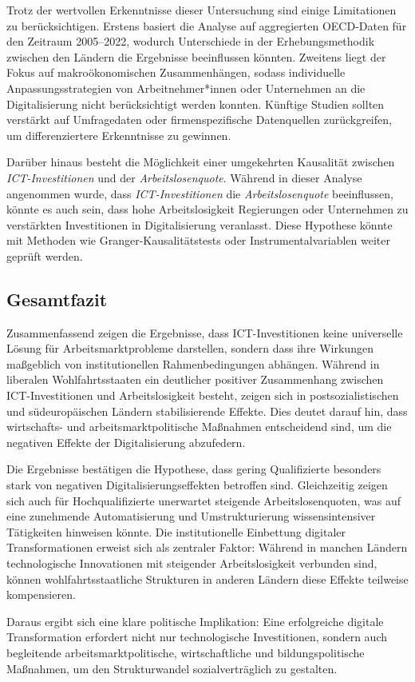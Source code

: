 Trotz der wertvollen Erkenntnisse dieser Untersuchung sind einige Limitationen zu 
berücksichtigen. Erstens basiert die Analyse auf aggregierten \ac{OECD}-Daten für den 
Zeitraum 2005–2022, wodurch Unterschiede in der Erhebungsmethodik zwischen den Ländern 
die Ergebnisse beeinflussen könnten. Zweitens liegt der Fokus auf makroökonomischen 
Zusammenhängen, sodass individuelle Anpassungsstrategien von Arbeitnehmer*innen oder 
Unternehmen an die Digitalisierung nicht berücksichtigt werden konnten. Künftige Studien 
sollten verstärkt auf Umfragedaten oder firmenspezifische Datenquellen zurückgreifen, um 
differenziertere Erkenntnisse zu gewinnen.

Darüber hinaus besteht die Möglichkeit einer umgekehrten Kausalität zwischen 
\textit{\ac{ICT}-Investitionen} und der \textit{Arbeitslosenquote}. Während in dieser 
Analyse angenommen wurde, dass \textit{\ac{ICT}-Investitionen} die 
\textit{Arbeitslosenquote} beeinflussen, könnte es auch sein, dass hohe Arbeitslosigkeit 
Regierungen oder Unternehmen zu verstärkten Investitionen in Digitalisierung veranlasst. 
Diese Hypothese könnte mit Methoden wie Granger-Kausalitätstests oder 
Instrumentalvariablen weiter geprüft werden.

\subsection{Gesamtfazit}

Zusammenfassend zeigen die Ergebnisse, dass \ac{ICT}-Investitionen keine universelle 
Lösung für Arbeitsmarktprobleme darstellen, sondern dass ihre Wirkungen maßgeblich von 
institutionellen Rahmenbedingungen abhängen. Während in liberalen Wohlfahrtsstaaten ein 
deutlicher positiver Zusammenhang zwischen \ac{ICT}-Investitionen und Arbeitslosigkeit 
besteht, zeigen sich in postsozialistischen und südeuropäischen Ländern stabilisierende 
Effekte. Dies deutet darauf hin, dass wirtschafts- und arbeitsmarktpolitische Maßnahmen 
entscheidend sind, um die negativen Effekte der Digitalisierung abzufedern.

Die Ergebnisse bestätigen die Hypothese, dass gering Qualifizierte besonders stark von 
negativen Digitalisierungseffekten betroffen sind. Gleichzeitig zeigen sich auch für 
Hochqualifizierte unerwartet steigende Arbeitslosenquoten, was auf eine zunehmende 
Automatisierung und Umstrukturierung wissensintensiver Tätigkeiten hinweisen könnte. Die 
institutionelle Einbettung digitaler Transformationen erweist sich als zentraler Faktor: 
Während in manchen Ländern technologische Innovationen mit steigender Arbeitslosigkeit 
verbunden sind, können wohlfahrtsstaatliche Strukturen in anderen Ländern diese Effekte 
teilweise kompensieren.

Daraus ergibt sich eine klare politische Implikation: Eine erfolgreiche digitale 
Transformation erfordert nicht nur technologische Investitionen, sondern auch begleitende 
arbeitsmarktpolitische, wirtschaftliche und bildungspolitische Maßnahmen, um den 
Strukturwandel sozialverträglich zu gestalten.
